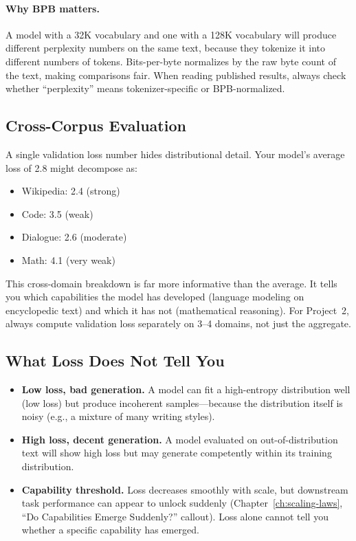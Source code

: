 \paragraph{Why BPB matters.} A model with a 32K vocabulary and one with a 128K vocabulary will produce different perplexity numbers on the same text, because they tokenize it into different numbers of tokens. Bits-per-byte normalizes by the raw byte count of the text, making comparisons fair. When reading published results, always check whether ``perplexity'' means tokenizer-specific or BPB-normalized.

\subsection{Cross-Corpus Evaluation}

A single validation loss number hides distributional detail. Your model's average loss of 2.8 might decompose as:
\begin{itemize}[nosep]
  \item Wikipedia: 2.4 (strong)
  \item Code: 3.5 (weak)
  \item Dialogue: 2.6 (moderate)
  \item Math: 4.1 (very weak)
\end{itemize}

This cross-domain breakdown is far more informative than the average. It tells you which capabilities the model has developed (language modeling on encyclopedic text) and which it has not (mathematical reasoning). For Project~2, always compute validation loss separately on 3--4 domains, not just the aggregate.

\subsection{What Loss Does Not Tell You}

\begin{itemize}[nosep]
  \item \textbf{Low loss, bad generation.} A model can fit a high-entropy distribution well (low loss) but produce incoherent samples---because the distribution itself is noisy (e.g., a mixture of many writing styles).
  \item \textbf{High loss, decent generation.} A model evaluated on out-of-distribution text will show high loss but may generate competently within its training distribution.
  \item \textbf{Capability threshold.} Loss decreases smoothly with scale, but downstream task performance can appear to unlock suddenly (Chapter~\ref{ch:scaling-laws}, ``Do Capabilities Emerge Suddenly?'' callout). Loss alone cannot tell you whether a specific capability has emerged.
\end{itemize}


